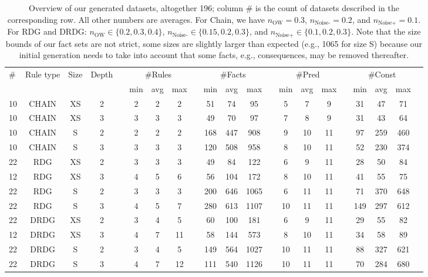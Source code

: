 \documentclass[letterpaper]{article} \usepackage{aaai20}  \usepackage{times}  \usepackage{helvet} \usepackage{courier}  \usepackage[hyphens]{url}  \usepackage{graphicx} \urlstyle{rm} \def\UrlFont{\rm}  \usepackage{graphicx}  \frenchspacing  \setlength{\pdfpagewidth}{8.5in}  \setlength{\pdfpageheight}{11in}  \usepackage{amsthm}
\theoremstyle{definition}
\newcommand{\nowa}{\ensuremath{n_{\text{OW}}}\xspace}
\newcommand{\nnoiseadd}{\ensuremath{n_{\text{Noise+}}}\xspace}
\newcommand{\nnoisemiss}{\ensuremath{n_{\text{Noise-}}}\xspace}
\begin{document}
\begin{table*}[t!]
    \centering
    \small
\begin{tabular}{lcccccccccccccccccccc}
    \toprule
     \multirow{2}{*}{\#} & \multirow{2}{*}{Rule type}   & \multirow{2}{*}{Size} & \multirow{2}{*}{Depth} &&  \multicolumn{3}{c}{\#Rules} &&\multicolumn{3}{c}{\#Facts} 
      &&\multicolumn{3}{c}{\#Pred} && \multicolumn{3}{c}{\#Const} \\ 
      \cmidrule{6-8}
      \cmidrule{10-12}
      \cmidrule{14-16}
      \cmidrule{18-20}
      &&& 
      && min&avg&max
      & &min&avg&max
      & &min&avg&max
      & &min&avg&max
      \\
\midrule
     10 &CHAIN  &   XS & 2 &&2&2&2 && 51&74&95 && 5&7&9 && 31&47&71  \\
          10 &CHAIN  &   XS & 3 &&3&3&3& & 49&70&97 && 7&8&9 && 31&43&64 \\
     10 & CHAIN  & S & 2  && 2&2&2 && 168&447&908 && 9&10&11 && 97&259&460\\
      10 &CHAIN  & S &  3 && 3&3&3 && 120&508&958 & &8&10&11 && 52&230&374\\
     \midrule
    22 & RDG  &  XS & 2  && 3&3&3 && 49&84&122 && 6&9&11 && 28&50&84 \\ 
     12 & RDG  &  XS & 3  && 4&5&6 && 56&104&172 && 8&10&11 && 41&55&75 \\
     22 &  RDG  & S & 2 && 3&3&3 && 200&646&1065 && 6&11&11 && 71&370&648   \\
     22 &RDG  &  S & 3 && 4&5&7 && 280&613&1107 && 10&11&11 && 149&297&612   \\
     \midrule
     22 &DRDG &  XS & 2  && 3&4&5 && 60&100&181 && 6&9&11 && 29&55&82    \\
     12 &DRDG &  XS &3  && 4&7&11 && 58&144&573 && 8&10&11 && 34&58&89   \\
     22 &DRDG &  S &2 && 3&4&5 && 149&564&1027 && 10&11&11 && 88&327&621   \\
     22 &DRDG &  S &3 && 4&7&12 && 111&540&1126 && 10&11&11 && 70&284&680   \\
\bottomrule
    \end{tabular}
    \caption{Overview of our generated datasets, altogether 196;
    column \# is the count of datasets described in the corresponding row.
    All other numbers are averages.
    For Chain, we have $\nowa=0.3$, $\nnoisemiss=0.2$, and $\nnoiseadd=0.1$.
    For RDG and DRDG:
$\nowa\in\{0.2,0.3,0.4\}$, $\nnoisemiss\in\{0.15,0.2,0.3\}$, and $\nnoiseadd\in\{0.1,0.2,0.3\}$.
Note that the size bounds of our fact sets are not strict, some sizes are slightly larger than expected (e.g., 1065 for size S) because our initial generation needs to take into account that some facts, e.g., consequences, may be removed thereafter. 
    }
    \label{tab:datasets}
\end{table*}
\end{document}
